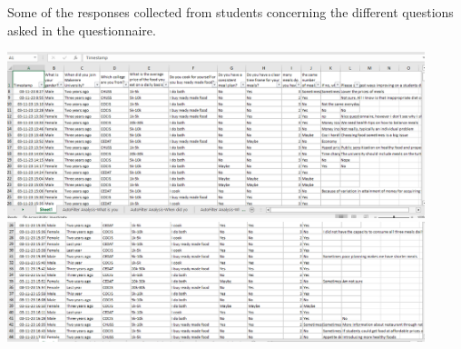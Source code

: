 \documentclass{article}
\begin{document}
Some of the responses collected from students concerning the different questions asked in the questionnaire.

\vspace{30pt}
\begin{center}

    \includegraphics[width=460px]{images/data.PNG}\\
    \vspace{30pt}
    \includegraphics[width=460px]{images/data2.PNG}

\end{center}
\end{document}
